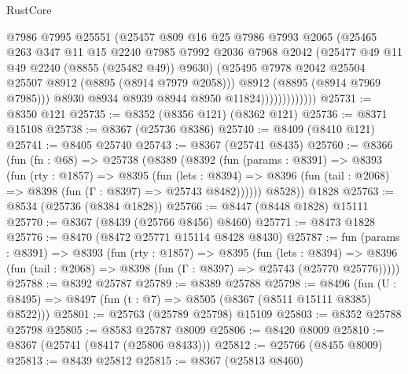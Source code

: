 \begin{lexlean}{RustCore}
\begin{coremodule}
                            @7986
                            @7995
                            @25551
                            (@25457
                              @809
                              @16
                              @25
                              @7986
                              @7993
                              @2065
                              (@25465
                                @263
                                @347
                                @11
                                @15
                                @2240
                                @7985
                                @7992
                                @2036
                                @7968
                                @2042
                                (@25477 @49 @11 @49 @2240 (@8855 (@25482 @49)) @9630)
                                (@25495 @7978 @2042 @25504 @25507 @8912 (@8895 (@8914 @7979 @2058)))
                                @8912
                                (@8895 (@8914 @7969 @7985)))
                              @8930
                              @8934
                              @8939
                              @8944
                              @8950
                              @11824)))))))))))))
@25731 := @8350 @121
@25735 := @8352 (@8356 @121) (@8362 @121)
@25736 := @8371 @15108
@25738 := @8367 (@25736 @8386)
@25740 := @8409 (@8410 @121)
@25741 := @8405 @25740
@25743 := @8367 (@25741 @8435)
@25760 := @8366
    (fun (fn : @68) =>
    @25738
      (@8389
        (@8392
          (fun (params : @8391) =>
          @8393
            (fun (rty : @1857) =>
            @8395
              (fun (lets : @8394) =>
              @8396 (fun (tail : @2068) => @8398 (fun (Γ : @8397) => @25743 @8482))))))
        @8528))
    @1828
@25763 := @8534 (@25736 (@8384 @1828))
@25766 := @8447 (@8448 @1828) @15111
@25770 := @8367 (@8439 (@25766 @8456) @8460)
@25771 := @8473 @1828
@25776 := @8470 (@8472 @25771 @15114 @8428 @8430)
@25787 := fun (params : @8391) =>
  @8393
    (fun (rty : @1857) =>
    @8395
      (fun (lets : @8394) =>
      @8396 (fun (tail : @2068) => @8398 (fun (Γ : @8397) => @25743 (@25770 @25776)))))
@25788 := @8392 @25787
@25789 := @8389 @25788
@25798 := @8496
    (fun (U : @8495) => @8497 (fun (t : @7) => @8505 (@8367 (@8511 @15111 @8385) @8522)))
@25801 := @25763 (@25789 @25798) @15109
@25803 := @8352 @25788 @25798
@25805 := @8583 @25787 @8009
@25806 := @8420 @8009
@25810 := @8367 (@25741 (@8417 (@25806 @8433)))
@25812 := @25766 (@8455 @8009)
@25813 := @8439 @25812
@25815 := @8367 (@25813 @8460)

\end{coremodule}
\end{lexlean}
